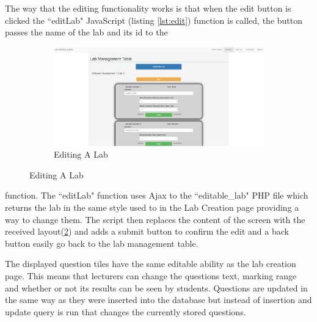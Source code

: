 \documentclass[11pt]{report}
\begin{document}
\noindent The way that the editing functionality works is that when  the edit button is clicked the ``editLab" JavaScript (listing \ref{lst:edit}) function is called, the button passes the name of the lab and its id to the

\begin{figure}
\vspace*{-\baselineskip}
\begin{figure}[H]
    \centering
    \includegraphics[width=1\textwidth]{images/implementation/edit-lab-page.png}
    \caption{Editing A Lab}
    \label{fig:edit-lab}
\end{figure}
\end{figure}

\noindent function. The ``editLab" function uses Ajax to the ``editable\_lab" PHP file which returns the lab in the same style used to in the Lab Creation page providing a way to change them. The script then replaces the content of the screen with the received layout(\ref{fig:edit-lab}) and adds a submit button to confirm the edit and a back button easily go back to the lab management table.

\noindent The displayed question tiles have the same editable ability as the lab creation page. This means that lecturers can change the questions text, marking range and whether or not its results can be seen by students. Questions are updated in the same way as they were inserted into the database but instead of insertion and update query is run that changes the currently stored questions.
\end{document}
